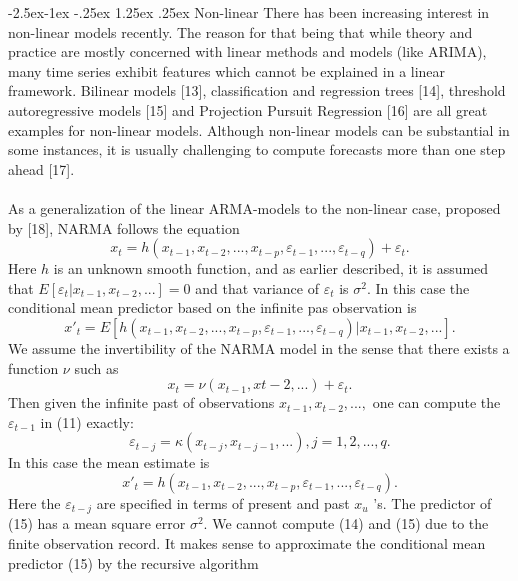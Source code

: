 \documentclass[runningheads,a4paper]{llncs}[2015/06/24]
\makeatletter
\renewcommand\paragraph{\@startsection{paragraph}{4}{\z@}%
            {-2.5ex\@plus -1ex \@minus -.25ex}%
            {1.25ex \@plus .25ex}%
            {\normalfont\normalsize\bfseries}}
\makeatother
\begin{document}
\paragraph{Non-linear}
There has been increasing interest in non-linear models recently. The reason for that being that while theory and practice are mostly concerned with linear methods and models (like ARIMA), many time series exhibit features which cannot be explained in a linear framework. Bilinear models [13], classification and regression trees [14], threshold autoregressive models [15] and Projection Pursuit Regression [16] are all great examples for non-linear models. Although non-linear models can be substantial in some instances, it is usually challenging to compute forecasts more than one step ahead [17]. \\\\ As a generalization of the linear ARMA-models to the non-linear case, proposed by [18], NARMA follows the equation
\begin{equation}
x_t = h(x_{t−1}, x_{t−2},..., x_{t−p}, ε_{t−1},...,ε_{t−q} ) + ε_t .
\end{equation}
Here $h$ is an unknown smooth function, and as earlier described, it is assumed that $E[ε_t|x_{t−1}, x_{t−2},...] = 0$ and that variance of $ε_t$ is $σ^2$. In this case the conditional mean predictor based on the infinite pas observation is
\begin{equation}
x'_t = E[h(x_{t−1}, x_{t−2},..., x_{t−p}, ε_{t−1},...,ε_{t−q} )|x_{t−1}, x_{t−2},...]. 
\end{equation}
We assume the invertibility of the NARMA model in the sense that there exists a function $ν$ such as
\begin{equation}
x_t = ν(x_{t−1}, x{t−2}, . . .) + ε_t . 
\end{equation}
Then given the infinite past of observations $x_{t−1}, x_{t−2},...,$ one can compute the $ε_{t−1}$ in (11) exactly:
\begin{equation}
ε_{t−j} = κ(x_{t− j}, x_{t− j−1}, . . .), j = 1, 2,..., q. 
\end{equation}
In this case the mean estimate is
\begin{equation}
x'_t = h(x_{t−1}, x_{t−2},..., x_{t−p}, ε_{t−1},...,ε_{t−q} ).
\end{equation}
Here the $ε_{t− j}$ are specified in terms of present and past $x_u$ ’s. The predictor of (15) has a mean square error $σ^2$. We cannot compute (14) and (15) due to the finite observation record. It makes sense to approximate the conditional mean predictor (15) by the recursive algorithm
\end{document}
